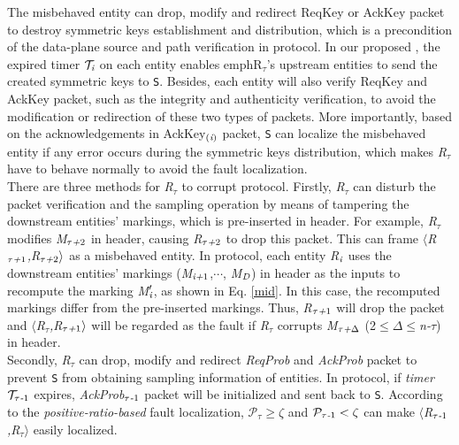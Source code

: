  The misbehaved entity can drop, modify and redirect ReqKey or AckKey packet to destroy symmetric keys establishment and distribution, which is a precondition of the data-plane source and path verification in \name{} protocol. In our proposed \namekey{}, the expired timer $\mathcal{T}_\emph{i}$ on each entity enables emph{R}$_\tau$'s upstream entities to send the created symmetric keys to {\tt S}. Besides, each entity will also verify ReqKey and AckKey packet, such as the integrity and authenticity verification, to avoid the modification or redirection of these two types of packets. More importantly, based on the acknowledgements in AckKey$_{(\emph{i})}$ packet, {\tt S} can localize the misbehaved entity if any error occurs during the symmetric keys distribution, which makes \emph{R}$_\tau$ have to behave normally to avoid the fault localization.\\
 There are three methods for \emph{R}$_\tau$ to corrupt \name{} protocol. Firstly, \emph{R}$_\tau$ can disturb the packet verification and the sampling operation by means of tampering the downstream entities' markings, which is pre-inserted in \name{} header. For example, \emph{R}$_\tau$ modifies \emph{M}$_{\tau\emph{+}2}$ in \name{} header, causing \emph{R}$_{\tau\emph{+}2}$ to drop this packet. This can frame $\langle$\emph{R}$_{\tau\emph{+}1}$\emph{,R}$_{\tau\emph{+}2}\rangle$ as a misbehaved entity. In \name{} protocol, each entity \emph{R}$_\emph{i}$ uses the downstream entities' markings (\emph{M}$_{\emph{i+}1}$,$\cdots$, \emph{M}$_\emph{D}$) in \name{} header as the inputs to recompute the marking \emph{M}$_\emph{i}^\prime$, as shown in Eq. \ref{mid}. In this case, the recomputed markings differ from the pre-inserted markings. Thus, \emph{R}$_{\tau\emph{+}1}$ will drop the packet and $\langle$\emph{R}$_{\tau}$\emph{,R}$_{\tau\emph{+}1}\rangle$ will be regarded as the fault if \emph{R}$_{\tau}$ corrupts \emph{M}$_{\tau\emph{+}\Delta}$ (2$\leq\Delta\leq$\emph{n-}$\tau$) in \name{} header.\\
\indent
Secondly, \emph{R}$_\tau$ can drop, modify and redirect \emph{ReqProb} and \emph{AckProb} packet to prevent {\tt S} from obtaining sampling information of entities. In \name{} protocol, if \emph{timer} $\mathcal{T}_{\tau\emph{-}1}$ expires, \emph{AckProb}$_{\tau\emph{-}1}$ packet will be initialized and sent back to {\tt S}. According to the \emph{positive-ratio-based} fault localization, $\mathcal{P}_\tau\geq\zeta$ and $\mathcal{P}_{\tau\emph{-}1}<\zeta$ can make $\langle$\emph{R}$_{\tau\emph{-}1}$\emph{,R}$_\tau\rangle$ easily localized.\\
